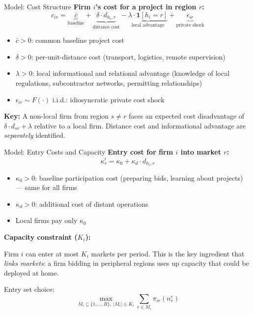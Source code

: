 \documentclass[9pt,aspectratio=169]{beamer}
\begin{document}
\begin{frame}{Model: Cost Structure}
\textbf{Firm $i$'s cost for a project in region $r$:}
\[
  c_{ir} = \underbrace{\bar{c}}_{\text{baseline}}
         + \underbrace{\delta \cdot d_{h_i, r}}_{\text{distance cost}}
         - \underbrace{\lambda \cdot \mathbf{1}[h_i = r]}_{\text{local advantage}}
         + \underbrace{\epsilon_{ir}}_{\text{private shock}}
\]

\medskip
\begin{itemize}
  \item $\bar{c} > 0$: common baseline project cost
  \item $\delta > 0$: per-unit-distance cost (transport, logistics,
        remote supervision)
  \item $\lambda > 0$: local informational and relational advantage
        (knowledge of local regulations, subcontractor networks,
        permitting relationships)
  \item $\epsilon_{ir} \sim F(\cdot)$ i.i.d.: idiosyncratic private cost shock
\end{itemize}

\medskip
\textbf{Key:} A non-local firm from region $s \neq r$ faces an expected cost
disadvantage of $\delta \cdot d_{sr} + \lambda$ relative to a local firm.
Distance cost and informational advantage are \emph{separately} identified.
\end{frame}

\begin{frame}{Model: Entry Costs and Capacity}
\textbf{Entry cost for firm $i$ into market $r$:}
\[
  \kappa_r^i = \kappa_0 + \kappa_d \cdot d_{h_i, r}
\]

\begin{itemize}
  \item $\kappa_0 > 0$: baseline participation cost (preparing bids,
        learning about projects) --- same for all firms
  \item $\kappa_d > 0$: additional cost of distant operations
  \item Local firms pay only $\kappa_0$
\end{itemize}

\bigskip
\textbf{Capacity constraint ($K_i$):}

Firm $i$ can enter at most $K_i$ markets per period. This is the key ingredient
that \textit{links markets}: a firm bidding in peripheral regions uses up
capacity that could be deployed at home.

\medskip
Entry set choice:
\[
  \max_{M_i \subseteq \{1,\dots,R\},\; |M_i| \leq K_i}
    \sum_{r \in M_i} \pi_{ir}(n_r^e)
\]
\end{frame}
\end{document}
